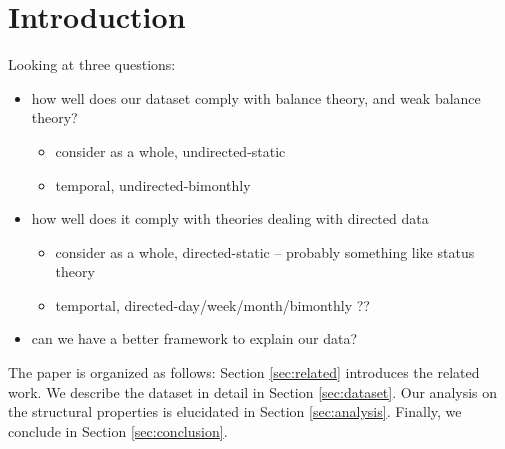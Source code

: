 \section{Introduction}
\label{sec:intro}
Looking at three questions:
\begin{itemize}
\item how well does our dataset comply with balance theory, and weak balance theory?
\begin{itemize}
\item consider as a whole, undirected-static
\item temporal, undirected-bimonthly
\end{itemize}
\item how well does it comply with theories dealing with directed data
\begin{itemize}
\item consider as a whole, directed-static -- probably something like status theory
\item temportal, directed-day/week/month/bimonthly ??
\end{itemize}
\item can we have a better framework to explain our data?
\end{itemize}

The paper is organized as follows: Section \ref{sec:related} introduces the related work. 
We describe the dataset in detail in Section \ref{sec:dataset}. 
Our analysis on the structural properties is elucidated in Section \ref{sec:analysis}. 
Finally, we conclude in Section \ref{sec:conclusion}.
